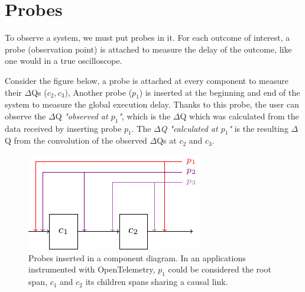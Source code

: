 \section{Probes}

To observe a system, we must put probes in it. For each outcome of interest, a probe (observation point) is attached to measure the delay of the outcome, like one would in a true oscilloscope. 

Consider the figure below, a probe is attached at every component to measure their $\Delta$Qs ($c_2, c_3$),  Another probe ($p_1$) is inserted at the beginning and end of the system to measure the global execution delay. Thanks to this probe, the user can observe the $\Delta$Q \textit{"observed at $p_1$"}, which is the $\Delta$Q which was calculated from the data received by inserting probe $p_1$. The \textit{$\Delta$Q "calculated at $p_1$"} is the resulting $\Delta$Q from the convolution of the observed $\Delta$Qs at $c_2$ and $c_3$.   
    \begin{figure}[H]
        \begin{center}
            \includegraphics[scale=1.8]{tikz/probes.pdf}
        \end{center}
        \caption{Probes inserted in a component diagram. In an applications instrumented with OpenTelemetry, $p_1$ could be considered the root span, $c_1$ and $c_2$ its children spans sharing a causal link.}
        \label{fig:probes}
    \end{figure}



